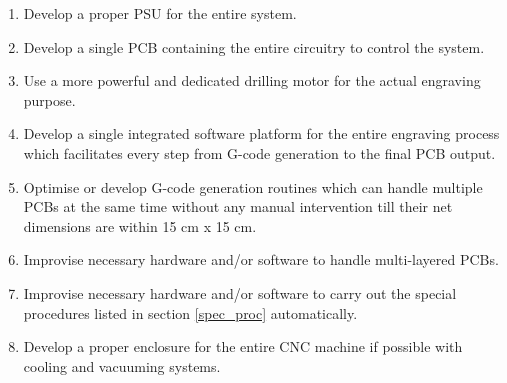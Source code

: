 \begin{enumerate}
    \item Develop a proper PSU for the entire system.
    \item Develop a single PCB containing the entire circuitry to control the system.
    \item Use a more powerful and dedicated drilling motor for the actual engraving purpose.
    \item Develop a single integrated software platform for the entire engraving process which facilitates every step from G-code generation to the final PCB output.
    \item Optimise or develop G-code generation routines which can handle multiple PCBs at the same time without any manual intervention till their net dimensions are within 15 cm x 15 cm.
    \item Improvise necessary hardware and/or software to handle multi-layered PCBs.
    \item Improvise necessary hardware and/or software to carry out the special procedures listed in section \ref{spec_proc} automatically.
    \item Develop a proper enclosure for the entire CNC machine if possible with cooling and vacuuming systems.
\end{enumerate}


